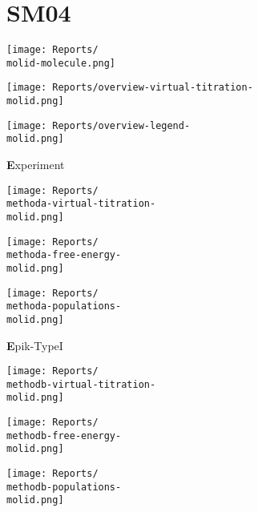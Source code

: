 \documentclass[9pt]{standalone}
\begin{document}
\newcommand{\molid}{SM04}
\newcommand{\methoda}{Experiment}
\newcommand{\methodb}{Epik-TypeI}
\newcommand{\methodc}{Jaguar-TypeI}
\newcommand{\methodd}{Epik-TypeII}
\newcommand{\methode}{Epik-TypeIII}
\section{\molid}
\noindent 
\begin{minipage}[s]{0.35\textwidth}\centering
\texttt{[image: Reports/\\molid-molecule.png]}
\end{minipage}
\begin{minipage}[s]{0.35\textwidth}
\texttt{[image: Reports/overview-virtual-titration-\\molid.png]}
\end{minipage}
\begin{minipage}[s]{0.23\textwidth}
\texttt{[image: Reports/overview-legend-\\molid.png]}
\end{minipage}

\begin{minipage}[s]{\textwidth}\centering
{\textbf \methoda}
\end{minipage}

\noindent
\begin{minipage}[s]{0.33\textwidth}\centering
\texttt{[image: Reports/\\methoda-virtual-titration-\\molid.png]}
\end{minipage}
\begin{minipage}[s]{0.33\textwidth}
\texttt{[image: Reports/\\methoda-free-energy-\\molid.png]}
\end{minipage}
\begin{minipage}[s]{0.33\textwidth}
\texttt{[image: Reports/\\methoda-populations-\\molid.png]}
\end{minipage}

\begin{minipage}[s]{\textwidth}\centering
{\textbf \methodb}
\end{minipage}

\noindent
\begin{minipage}[s]{0.33\textwidth}\centering
\texttt{[image: Reports/\\methodb-virtual-titration-\\molid.png]}
\end{minipage}
\begin{minipage}[s]{0.33\textwidth}
\texttt{[image: Reports/\\methodb-free-energy-\\molid.png]}
\end{minipage}
\begin{minipage}[s]{0.33\textwidth}
\texttt{[image: Reports/\\methodb-populations-\\molid.png]}
\end{minipage}
\end{document}
